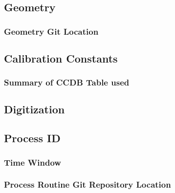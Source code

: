 \section{}


\subsection{Geometry}

\subsubsection{Geometry Git Location}

\subsection{Calibration Constants}

\subsubsection{Summary of CCDB Table used}

\subsection{Digitization}

\subsection{Process ID}

\subsubsection{Time Window}

\subsubsection{Process Routine Git Repository Location}


